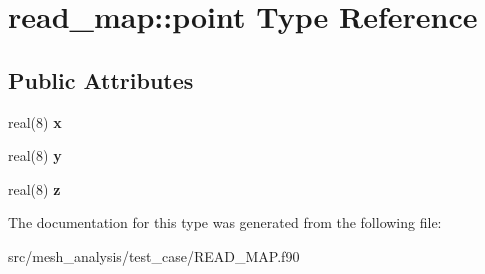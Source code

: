 \hypertarget{structread__map_1_1point}{}\section{read\+\_\+map\+:\+:point Type Reference}
\label{structread__map_1_1point}
\subsection*{Public Attributes}
\begin{DoxyCompactItemize}
\item 
\mbox{\label{structread__map_1_1point_a9c7137561107e8eff278d72e723c44f3}} 
real(8) {\bfseries x}
\item 
\mbox{\label{structread__map_1_1point_a31dedcbc2e71171090852912a4c0247d}} 
real(8) {\bfseries y}
\item 
\mbox{\label{structread__map_1_1point_ac937c64a20091ec67b073a1fd0f00562}} 
real(8) {\bfseries z}
\end{DoxyCompactItemize}


The documentation for this type was generated from the following file\+:\begin{DoxyCompactItemize}
\item 
src/mesh\+\_\+analysis/test\+\_\+case/R\+E\+A\+D\+\_\+\+M\+A\+P.\+f90\end{DoxyCompactItemize}
